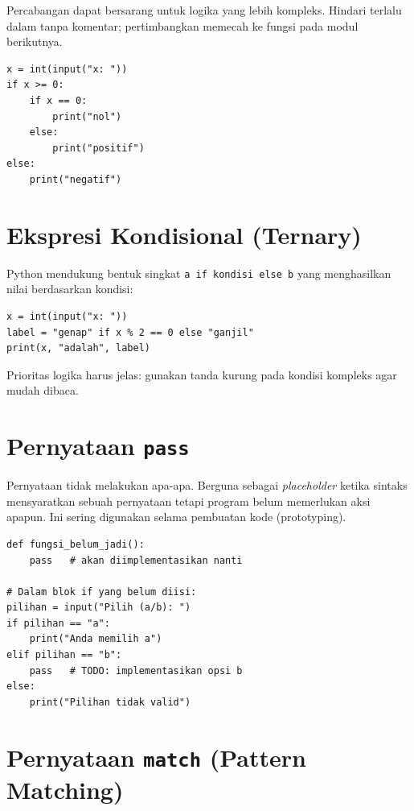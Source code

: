 ﻿\documentclass[../main.tex]{subfiles}
\begin{document}
Percabangan dapat bersarang untuk logika yang lebih kompleks. Hindari terlalu dalam tanpa komentar; pertimbangkan memecah ke fungsi pada modul berikutnya.

\begin{lstlisting}[caption=Contoh percabangan bersarang]
x = int(input("x: "))
if x >= 0:
    if x == 0:
        print("nol")
    else:
        print("positif")
else:
    print("negatif")
\end{lstlisting}

\section{Ekspresi Kondisional (Ternary)}

Python mendukung bentuk singkat \texttt{a if kondisi else b} yang menghasilkan nilai berdasarkan kondisi:

\begin{lstlisting}[caption=Ekspresi ternary]
x = int(input("x: "))
label = "genap" if x % 2 == 0 else "ganjil"
print(x, "adalah", label)
\end{lstlisting}

\begin{catatan}
Prioritas logika harus jelas: gunakan tanda kurung pada kondisi kompleks agar mudah dibaca.
\end{catatan}

\section{Pernyataan \texttt{pass}}

Pernyataan  tidak melakukan apa-apa. Berguna sebagai \textit{placeholder} ketika sintaks mensyaratkan sebuah pernyataan tetapi program belum memerlukan aksi apapun. Ini sering digunakan selama pembuatan kode (prototyping).

\begin{lstlisting}[caption=Penggunaan pass sebagai placeholder (Tutorial Python ss4.6)]
def fungsi_belum_jadi():
    pass   # akan diimplementasikan nanti

# Dalam blok if yang belum diisi:
pilihan = input("Pilih (a/b): ")
if pilihan == "a":
    print("Anda memilih a")
elif pilihan == "b":
    pass   # TODO: implementasikan opsi b
else:
    print("Pilihan tidak valid")
\end{lstlisting}

\section{Pernyataan \texttt{match} (Pattern Matching)}
\end{document}
